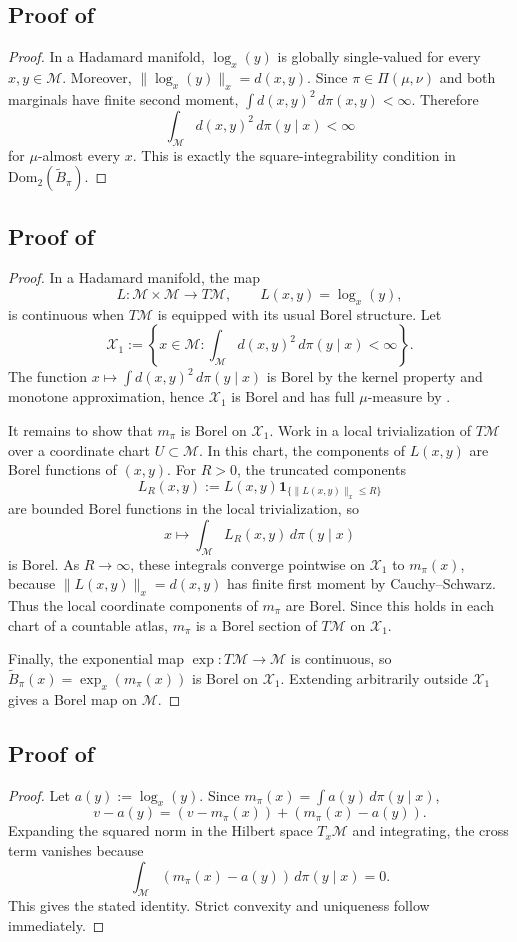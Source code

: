 \documentclass[10pt]{article} %
\theoremstyle{definition}
\providecommand{\1}{\mathbf{1}}
\providecommand{\sM}{\mathcal{M}}
\providecommand{\sX}{\mathcal{X}}
\begin{document}
\subsection{Proof of }
\begin{proof}
In a Hadamard manifold, $\log_x(y)$ is globally single-valued for every $x,y\in\sM$. Moreover, $\|\log_x(y)\|_x=d(x,y)$. Since $\pi\in\Pi(\mu,\nu)$ and both marginals have finite second moment, $\int d(x,y)^2\,d\pi(x,y)<\infty$. Therefore
\[
\int_{\sM} d(x,y)^2\,d\pi(y\mid x)<\infty
\]
for $\mu$-almost every $x$. This is exactly the square-integrability condition in $\mathrm{Dom}_2(\widetilde B_\pi)$.
\end{proof}

\subsection{Proof of }
\begin{proof}
In a Hadamard manifold, the map
\[
L:\sM\times\sM\to T\sM,\qquad L(x,y)=\log_x(y),
\]
is continuous when $T\sM$ is equipped with its usual Borel structure. Let
\[
\sX_1:=\left\{x\in\sM:\int_{\sM} d(x,y)^2\,d\pi(y\mid x)<\infty\right\}.
\]
The function $x\mapsto\int d(x,y)^2\,d\pi(y\mid x)$ is Borel by the kernel property and monotone approximation, hence $\sX_1$ is Borel and has full $\mu$-measure by .

It remains to show that $m_\pi$ is Borel on $\sX_1$. Work in a local trivialization of $T\sM$ over a coordinate chart $U\subset\sM$. In this chart, the components of $L(x,y)$ are Borel functions of $(x,y)$. For $R>0$, the truncated components
\[
L_R(x,y):=L(x,y)\1_{\{\|L(x,y)\|_x\le R\}}
\]
are bounded Borel functions in the local trivialization, so
\[
x\mapsto\int_{\sM} L_R(x,y)\,d\pi(y\mid x)
\]
is Borel. As $R\to\infty$, these integrals converge pointwise on $\sX_1$ to $m_\pi(x)$, because $\|L(x,y)\|_x=d(x,y)$ has finite first moment by Cauchy--Schwarz. Thus the local coordinate components of $m_\pi$ are Borel. Since this holds in each chart of a countable atlas, $m_\pi$ is a Borel section of $T\sM$ on $\sX_1$.

Finally, the exponential map $\exp:T\sM\to\sM$ is continuous, so $\widetilde B_\pi(x)=\exp_x(m_\pi(x))$ is Borel on $\sX_1$. Extending arbitrarily outside $\sX_1$ gives a Borel map on $\sM$.
\end{proof}




\subsection{Proof of }
\begin{proof}
Let $a(y):=\log_x(y)$. Since $m_\pi(x)=\int a(y)\,d\pi(y\mid x)$,
\[
v-a(y)=(v-m_\pi(x))+(m_\pi(x)-a(y)).
\]
Expanding the squared norm in the Hilbert space $T_x\sM$ and integrating, the cross term vanishes because
\[
\int_{\sM}(m_\pi(x)-a(y))\,d\pi(y\mid x)=0.
\]
This gives the stated identity. Strict convexity and uniqueness follow immediately.
\end{proof}
\end{document}
